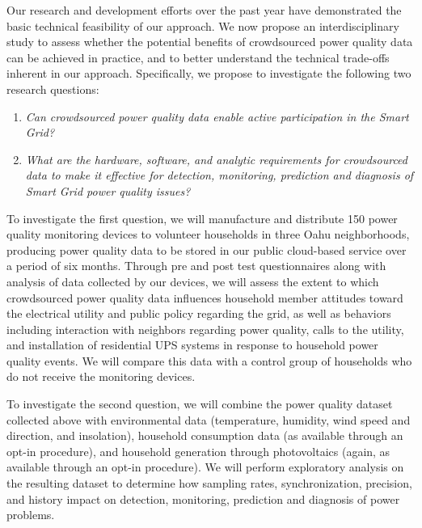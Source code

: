 Our research and development efforts over the past year have demonstrated the basic technical feasibility of our approach.   We now propose an interdisciplinary study to assess whether the potential benefits of crowdsourced power quality data can be achieved in practice, and to better understand the technical trade-offs inherent in our approach.  Specifically, we propose to investigate the following two research questions:

\begin{enumerate}

\item {\em Can crowdsourced power quality data enable active participation in the Smart Grid?}

\item {\em What are the hardware, software, and analytic requirements for crowdsourced data to make it effective for detection, monitoring, prediction and diagnosis of Smart Grid power quality issues?}

\end{enumerate}

To investigate the first question, we will manufacture and distribute 150 power quality monitoring devices to volunteer households in three Oahu neighborhoods, producing power quality data to be stored in our public cloud-based service over a period of six months. Through pre and post test questionnaires along with analysis of data collected by our devices, we will assess the extent to which crowdsourced power quality data influences household member attitudes toward the electrical utility and public policy regarding the grid, as well as behaviors including interaction with neighbors regarding power quality, calls to the utility, and installation of residential UPS systems in response to household power quality events.  We will compare this data with a control group of households who do not receive the monitoring devices. 

To investigate the second question, we will combine the power quality dataset collected above with environmental data (temperature, humidity, wind speed and direction, and insolation), household consumption data (as available through an opt-in procedure), and household generation through photovoltaics (again, as available through an opt-in procedure).  We will perform exploratory analysis on the resulting dataset to determine how sampling rates, synchronization, precision, and history impact on detection, monitoring, prediction and diagnosis of power problems.

